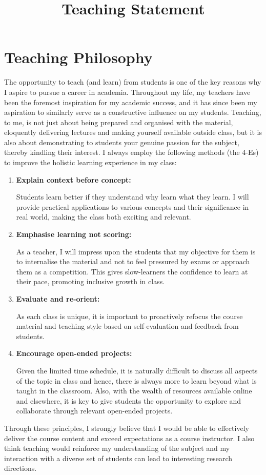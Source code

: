 \documentclass[12pt,a4paper,sans]{moderncv} %
\title{Teaching Statement}
\begin{document}
\makecvtitle %


\section{Teaching Philosophy}
The opportunity to teach (and learn) from students is one of the key reasons why I aspire to pursue a career in academia. Throughout my life, my teachers have been the foremost inspiration for my academic success, and it has since been my aspiration to similarly serve as a constructive influence on my students. Teaching, to me, is not just about being prepared and organised with the material, eloquently delivering lectures and making yourself available outside class, but it is also about demonstrating to students your genuine passion for the subject, thereby kindling their interest. I always employ the following methods (the 4-Es) to improve the holistic learning experience in my class:
\begin{enumerate}

\item \textbf{Explain context before concept:} \par Students learn better if they understand why learn what they learn. I will provide practical applications to various concepts and their significance in real world, making the class both exciting and relevant.
\item \textbf{Emphasise learning not scoring:}\par As a teacher, I will impress upon the students that my objective for them is to internalise the material and not to feel pressured by exams or approach them as a competition. This gives slow-learners the confidence to learn at their pace, promoting inclusive growth in class.
\item \textbf{Evaluate and re-orient:} \par As each class is unique, it is important to proactively refocus the course material and teaching style based on self-evaluation and feedback from students. 
\item \textbf{Encourage open-ended projects:} \par Given the limited time schedule,
it is naturally difficult to discuss all aspects of the topic in class and hence, there is always more to learn
beyond what is taught in the classroom. Also, with the wealth of resources available online and elsewhere,
it is key to give students the opportunity to explore and collaborate through relevant open-ended projects.
\end{enumerate}
Through these principles, I strongly believe that I would be able to effectively deliver the course content and
exceed expectations as a course instructor. I also think teaching would reinforce my understanding of the
subject and my interaction with a diverse set of students can lead to interesting research directions.
\end{document}
